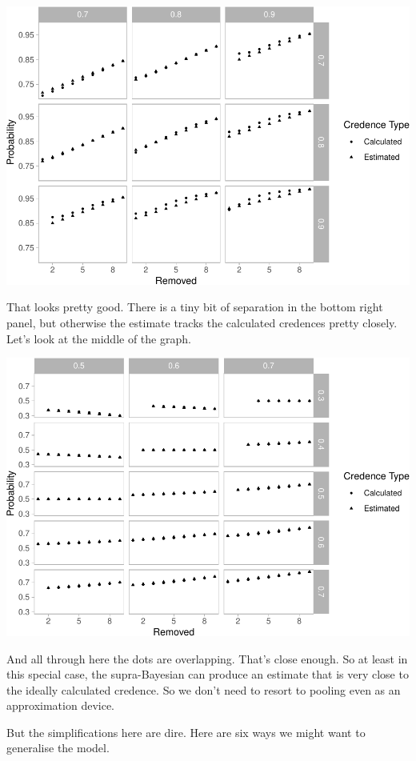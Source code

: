 \documentclass[
  12pt,
]{article}
\begin{document}
\includegraphics{mixing-experts_files/figure-latex/unnamed-chunk-5-1.pdf}

That looks pretty good. There is a tiny bit of separation in the bottom
right panel, but otherwise the estimate tracks the calculated credences
pretty closely. Let's look at the middle of the graph.

\includegraphics{mixing-experts_files/figure-latex/unnamed-chunk-6-1.pdf}

And all through here the dots are overlapping. That's close enough. So
at least in this special case, the supra-Bayesian can produce an
estimate that is very close to the ideally calculated credence. So we
don't need to resort to pooling even as an approximation device.

But the simplifications here are dire. Here are six ways we might want
to generalise the model.
\end{document}
